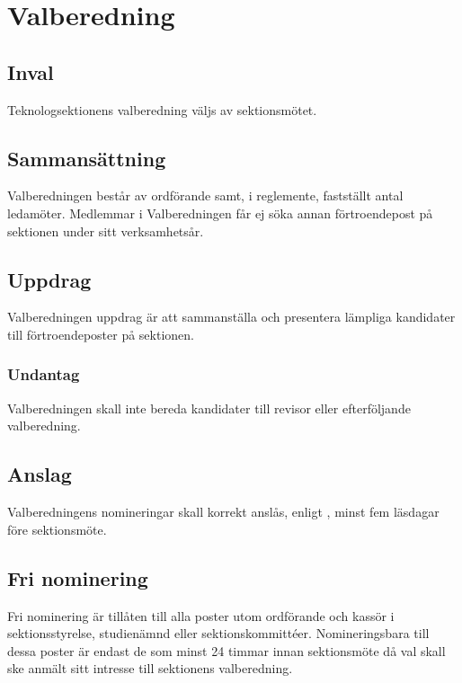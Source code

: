 \section{Valberedning}

\subsection{Inval}
Teknologsektionens valberedning väljs av sektionsmötet.

\subsection{Sammansättning}
Valberedningen består av ordförande samt, i reglemente, fastställt antal ledamöter. Medlemmar i Valberedningen får ej söka annan förtroendepost på sektionen under sitt verksamhetsår.

\subsection{Uppdrag}
Valberedningen uppdrag är att sammanställa och presentera lämpliga kandidater till förtroendeposter på sektionen.

\subsubsection{Undantag}
Valberedningen skall inte bereda kandidater till revisor eller efterföljande valberedning.

\subsection{Anslag}
Valberedningens nomineringar skall korrekt anslås, enligt , minst fem läsdagar före sektionsmöte.

\subsection{Fri nominering}
Fri nominering är tillåten till alla poster utom ordförande och kassör i sektionsstyrelse, studienämnd eller sektionskommittéer. Nomineringsbara till dessa poster är endast de som minst 24 timmar innan sektionsmöte då val skall ske anmält sitt intresse till sektionens valberedning.
